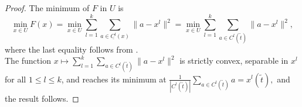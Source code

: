 \begin{proof}
The minimum of $F$ in $U$ is
\begin{equation*}
\min\limits_{x \in U} F(x) = \min\limits_{x \in U} \sum\limits_{l=1}^{k} \sum\limits_{a \in \underline{C^l}(x)} \|a - x^l \|^2 = \min\limits_{x \in U} \sum\limits_{l=1}^{k} \sum\limits_{a \in C^l(\widetilde{t})} \|a - x^l \|^2 ,
\end{equation*}
where the last equality follows from . \\
The function $x \mapsto \sum\limits_{l=1}^{k} \sum\limits_{a \in C^l(\widetilde{t})} \|a - x^l \|^2$ is strictly convex, separable in $x^l$ for all $1 \leq l \leq k$, and reaches its minimum at $\frac{1}{\left| C^l(\widetilde{t}) \right|} \sum\limits_{a \in C^l(\widetilde{t})} a = x^l(\widetilde{t}),$ and the result follows.
\end{proof}
